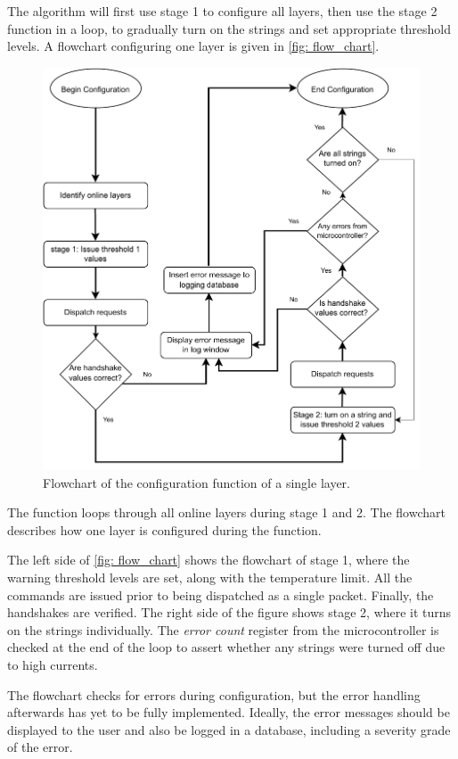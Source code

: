 \documentclass[main.tex]{subfiles}
\begin{document}
The algorithm will first use stage 1 to configure all layers, then use the stage 2 function in a loop, to gradually turn on the strings and set appropriate threshold levels. A flowchart configuring one layer is given in \autoref{fig: flow_chart}.

\begin{figure}[!ht]
    \centering
    \includegraphics[width=12cm, scale=1.5]{images/Configuration Flowchart.pdf}
    \caption{Flowchart of the configuration function of a single layer.}
    \label{fig: flow_chart}
\end{figure}
\FloatBarrier

The function loops through all online layers during stage 1 and 2. The flowchart describes how one layer is configured during the function.

The left side of \autoref{fig: flow_chart} shows the flowchart of stage 1, where the warning threshold levels are set, along with the temperature limit. All the commands are issued prior to being dispatched as a single packet. Finally, the handshakes are verified. The right side of the figure shows stage 2, where it turns on the strings individually. The \textit{error count} register from the microcontroller is checked at the end of the loop to assert whether any strings were turned off due to high currents. 

The flowchart checks for errors during configuration, but the error handling afterwards has yet to be fully implemented. Ideally, the error messages should be displayed to the user and also be logged in a database, including a severity grade of the error.
\end{document}

